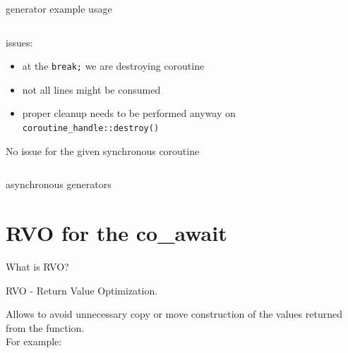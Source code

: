 \documentclass[10pt]{beamer}
\def \coroCpp {coroLexer.py -x}
\begin{document}
\begin{frame}{generator example usage}


\inputminted{\coroCpp}{code-examples/async-raii/generator_usage.cpp}

\pause

\vfill

issues:
\begin{itemize}[<+-| alert@+>]
	\item at the \texttt{break;} we are destroying coroutine
	\item not all lines might be consumed
	\item proper cleanup needs to be performed anyway on \texttt{coroutine\_handle::destroy()}
\end{itemize}

\end{frame}

\begin{frame}{No issue for the given synchronous coroutine}

\inputminted{\coroCpp}{code-examples/async-raii/generator.cpp}

\pause


\end{frame}

\begin{frame}{asynchronous generators}

\end{frame}


\section{RVO for the co\_await}

\begin{frame}{What is RVO?}
\centerline{\alert{RVO} - Return Value Optimization.}

\vfill

Allows to avoid unnecessary copy or move construction of the values returned from the function. \\
\pause
For example:


\inputminted[frame=single]{c++}{code-examples/RVO_examples/example.cpp}



\end{frame}
\end{document}
